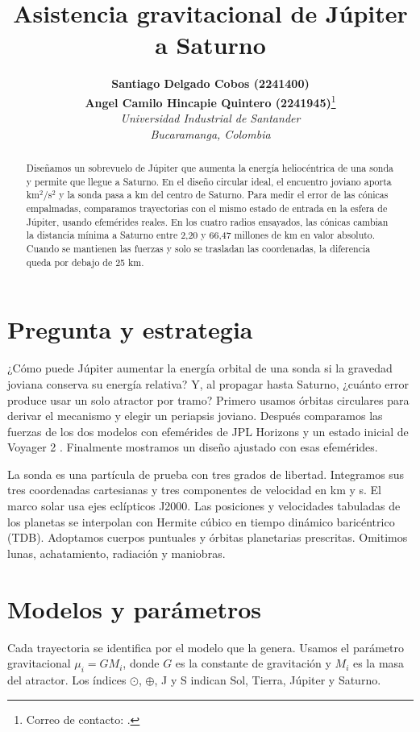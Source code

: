 \documentclass[11pt,letterpaper]{article}
\title{Asistencia gravitacional de Júpiter a Saturno}
\author{\textbf{Santiago Delgado Cobos (2241400)}\\
\textbf{Angel Camilo Hincapie Quintero (2241945)}\thanks{Correo de contacto: \href{mailto:\contacto}{\contacto}.}\\
\textit{Universidad Industrial de Santander}\\
\textit{Bucaramanga, Colombia}}
\date{\versioninforme}
\begin{document}
\maketitle
\begin{abstract}
Diseñamos un sobrevuelo de Júpiter que aumenta la energía heliocéntrica de una sonda y permite que llegue a Saturno. En el diseño circular ideal, el encuentro joviano aporta \EnergiaGanada{} km$^2$/s$^2$ y la sonda pasa a \MinimoDiseno{} km del centro de Saturno. Para medir el error de las cónicas empalmadas, comparamos trayectorias con el mismo estado de entrada en la esfera de Júpiter, usando efemérides reales. En los cuatro radios ensayados, las cónicas cambian la distancia mínima a Saturno entre 2,20 y 66,47 millones de km en valor absoluto. Cuando se mantienen las fuerzas y solo se trasladan las coordenadas, la diferencia queda por debajo de 25 km.
\end{abstract}

\section{Pregunta y estrategia}
¿Cómo puede Júpiter aumentar la energía orbital de una sonda si la gravedad joviana conserva su energía relativa? Y, al propagar hasta Saturno, ¿cuánto error produce usar un solo atractor por tramo? Primero usamos órbitas circulares para derivar el mecanismo y elegir un periapsis joviano. Después comparamos las fuerzas de los dos modelos con efemérides de JPL Horizons y un estado inicial de Voyager 2 \cite{horizons}. Finalmente mostramos un diseño ajustado con esas efemérides.

La sonda es una partícula de prueba con tres grados de libertad. Integramos sus tres coordenadas cartesianas y tres componentes de velocidad en km y s. El marco solar usa ejes eclípticos J2000. Las posiciones y velocidades tabuladas de los planetas se interpolan con Hermite cúbico en tiempo dinámico baricéntrico (TDB). Adoptamos cuerpos puntuales y órbitas planetarias prescritas. Omitimos lunas, achatamiento, radiación y maniobras.

\section{Modelos y parámetros}
Cada trayectoria se identifica por el modelo que la genera. Usamos el parámetro gravitacional $\mu_i=GM_i$, donde $G$ es la constante de gravitación y $M_i$ es la masa del atractor. Los índices $\odot$, $\oplus$, J y S indican Sol, Tierra, Júpiter y Saturno.
\end{document}
